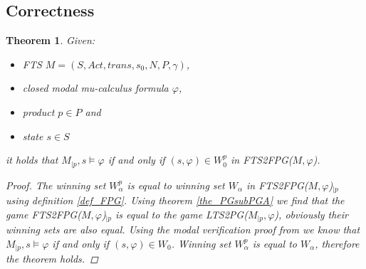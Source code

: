 \documentclass[]{article}
\newtheorem{theorem}{Theorem}[section]
\begin{document}
\subsection{Correctness}


\begin{theorem}
	\label{the_FPG_ver_FTS}
	Given:
	\begin{itemize}
		\item FTS $M = (S, Act, trans, s_0, N, P, \gamma)$,
		\item closed modal mu-calculus formula $\varphi$,
		\item product $p \in P$ and
		\item state $s \in S$
	\end{itemize}
it holds that $M_{|p}, s \models \varphi$ if and only if $(s, \varphi) \in W_0^p$ in FTS2FPG($M, \varphi$).
\begin{proof}
	The winning set $W_\alpha^p$ is equal to winning set $W_\alpha$ in FTS2FPG($M, \varphi$)$_{|p}$ using definition \ref{def_FPG}. Using theorem \ref{the_PGsubPGA} we find that the game FTS2FPG($M, \varphi$)$_{|p}$ is equal to the game LTS2PG($M_{|p}, \varphi$), obviously their winning sets are also equal. Using the modal verification proof from \cite{Bradfield2018} we know that $M_{|p}, s \models \varphi$ if and only if $(s, \varphi) \in W_0$. Winning set $W_\alpha^p$ is equal to $W_\alpha$, therefore the theorem holds.
\end{proof}
\end{theorem}
\end{document}
